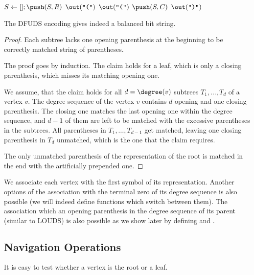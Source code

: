 \begin{algorithmic}
	\State $S \gets []; \push(S, R)$ 
	\State $\out(\openingParen)$
			\State $\out(\openingParen)$
			\State $\push(S, C)$
		\EndFor
		\State $\out(\closingParen)$
	\EndWhile
\EndFunction
\end{algorithmic}

\begin{lemma}\label{l:dfuds}
	The DFUDS encoding gives indeed a balanced bit string.
\end{lemma}
\begin{proof}
	Each subtree lacks one opening parenthesis at the beginning to be correctly matched string of parentheses.
	
	The proof goes by induction.
	The claim holds for a leaf, which is only a closing parenthesis, which misses its matching opening one.
	
	We assume, that the claim holds for all $d = \degree(v)$ subtrees $T_1, \ldots, T_d$ of a vertex $v$.
	The degree sequence of the vertex $v$ contains $d$ opening and one closing parenthesis.
	The closing one matches the last opening one within the degree sequence, and $d - 1$ of them are left to be matched with the excessive parentheses in the subtrees.
	All parentheses in $T_1, \ldots, T_{d-1}$ get matched, leaving one closing parenthesis in $T_d$ unmatched, which is the one that the claim requires.
	
	The only unmatched parenthesis of the representation of the root is matched in the end with the artificially prepended one.
\end{proof}

We associate each vertex with the first symbol of its representation.
Another options of the association with the terminal zero of its degree sequence is also possible (we will indeed define functions which switch between them).
The association which an opening parenthesis in the degree sequence of its parent (similar to LOUDS) is also possible as we show later by defining \dfudsRank{} and \dfudsSelect{}.

\subsection{Navigation Operations}

It is easy to test whether a vertex is the root or a leaf.

